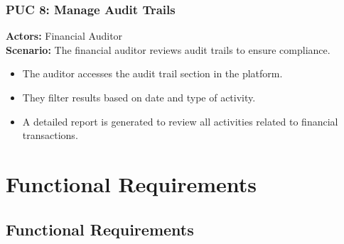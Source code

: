 \documentclass[12pt]{article}
\begin{document}
\subsubsection{PUC 8: Manage Audit Trails}
\textbf{Actors:} Financial Auditor \\
\textbf{Scenario:} The financial auditor reviews audit trails to ensure compliance.
\begin{itemize}
    \item The auditor accesses the audit trail section in the platform.
    \item They filter results based on date and type of activity.
    \item A detailed report is generated to review all activities related to financial transactions.
\end{itemize}

\section{Functional Requirements}
\subsection{Functional Requirements}
\end{document}
